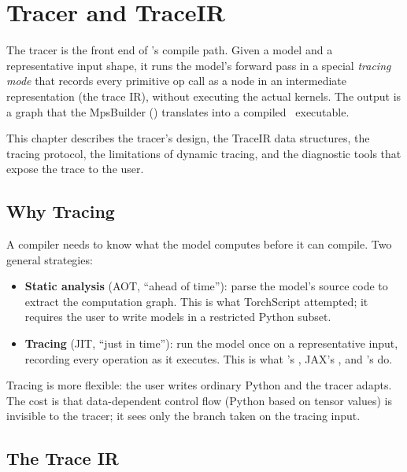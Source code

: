 \chapter{Tracer and TraceIR}
\label{ch:tracer}

The tracer is the front end of \Lucid's compile path. Given a
model and a representative input shape, it runs the model's
forward pass in a special \emph{tracing mode} that records every
primitive op call as a node in an intermediate representation
(the trace IR), without executing the actual kernels. The
output is a graph that the MpsBuilder
() translates into a compiled
\MPSGraph\ executable.

This chapter describes the tracer's design, the TraceIR data
structures, the tracing protocol, the limitations of dynamic
tracing, and the diagnostic tools that expose the trace to the
user.

\section{Why Tracing}
\label{sec:tracer:why_tracing}

A compiler needs to know what the model computes before it can
compile. Two general strategies:

\begin{itemize}
  \item \textbf{Static analysis} (AOT, ``ahead of time''): parse
    the model's source code to extract the computation graph.
    This is what TorchScript attempted; it requires the user to
    write models in a restricted Python subset.
  \item \textbf{Tracing} (JIT, ``just in time''): run the model
    once on a representative input, recording every operation as
    it executes. This is what 's ,
    JAX's , and \Lucid's  do.
\end{itemize}

Tracing is more flexible: the user writes ordinary Python and
the tracer adapts. The cost is that data-dependent control flow
(Python  based on tensor values) is invisible to the
tracer; it sees only the branch taken on the tracing input.

\section{The Trace IR}
\label{sec:tracer:trace_ir}

